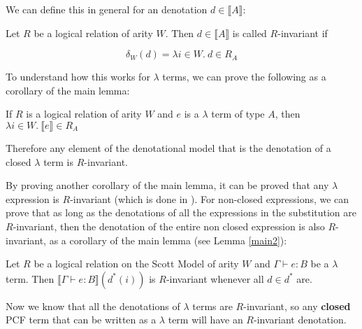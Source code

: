 We can define this in general for an denotation $d \in \llbracket A \rrbracket$:

\vspace{0.5cm}

\begin{defn}{\citep{Streicher06}}Let $R$ be a logical relation of arity $W$. Then $d \in \llbracket A \rrbracket$ is called $R$-invariant if 

\[\delta_W(d) = \lambda i \in W. \ d \in R_A \]
\end{defn}


To understand how this works for $\lambda$ terms, we can prove the following as a corollary of the main lemma:

\vspace{0.5cm}

\begin{cor}{\citep{Streicher06}}
If $R$ is a logical relation of arity $W$ and $e$ is a $\lambda$ term of type $A$, then $\lambda i \in W. \ \llbracket e \rrbracket \in R_A$
\end{cor}

Therefore any element of the denotational model that is the denotation of a closed $\lambda$ term is $R$-invariant.

By proving another corollary of the main lemma, it can be proved that any $\lambda$ expression is $R$-invariant (which is done in \citep{Streicher06}). For non-closed expressions, we can prove that as long as the denotations of all the expressions in the substitution are $R$-invariant, then the denotation of the entire non closed expression is also $R$-invariant, as a corollary of the main lemma (see Lemma \ref{main2}):

\vspace{0.5cm}

\begin{cor}{\citep{Streicher06}}
Let $R$ be a logical relation on the Scott Model of arity $W$ and $\Gamma \vdash e : B$ be a $\lambda$ term. Then $\llbracket \Gamma \vdash e : B \rrbracket(d^*(i))$ is $R$-invariant whenever all $d \in d^*$ are.
\end{cor}

Now we know that all the denotations of $\lambda$ terms are $R$-invariant, so any \textbf{closed} PCF term that can be written as a $\lambda$ term will have  an $R$-invariant denotation. 

